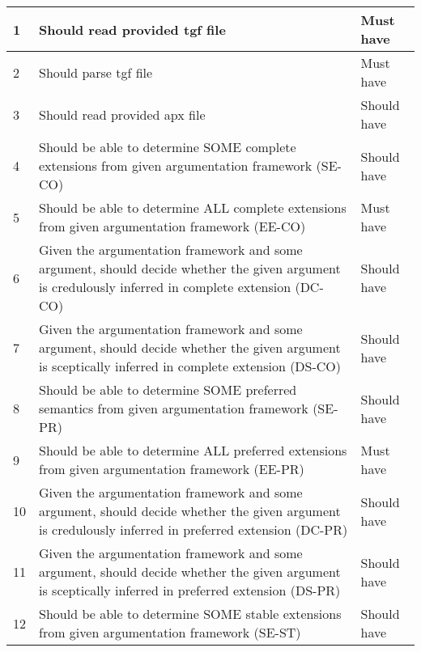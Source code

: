 \begin{center}
\begin{longtable}{| p{} | p{} | p{} |}
1  & Should read provided tgf file                                                                                                                           & Must have   \\ \hline
2  & Should parse tgf file                                                                                                                                   & Must have   \\ \hline
3  & Should read provided apx file                                                                                                                           & Should have \\ \hline
4  & Should be able to determine SOME complete extensions from given argumentation framework (SE-CO)                                                         & Should have \\ \hline
5  & Should be able to determine ALL complete extensions from given argumentation framework (EE-CO)                                                          & Must have \\ \hline
6  & Given the argumentation framework and some argument, should decide whether the given argument is credulously inferred in complete extension (DC-CO)     & Should have \\ \hline
7  & Given the argumentation framework and some argument, should decide whether the given argument is sceptically inferred in complete extension (DS-CO)     & Should have \\ \hline
8  & Should be able to determine SOME preferred semantics from given argumentation framework (SE-PR)                                                         & Should have \\ \hline
9  & Should be able to determine ALL preferred extensions from given argumentation framework (EE-PR)                                                         & Must have \\ \hline
10 & Given the argumentation framework and some argument, should decide whether the given argument is credulously inferred in preferred extension (DC-PR)    & Should have \\ \hline
11 & Given the argumentation framework and some argument, should decide whether the given argument is sceptically inferred in preferred extension (DS-PR)    & Should have \\ \hline
12 & Should be able to determine SOME stable extensions from given argumentation framework (SE-ST)                                                           & Should have \\ \hline

\end{longtable}
\end{center}
